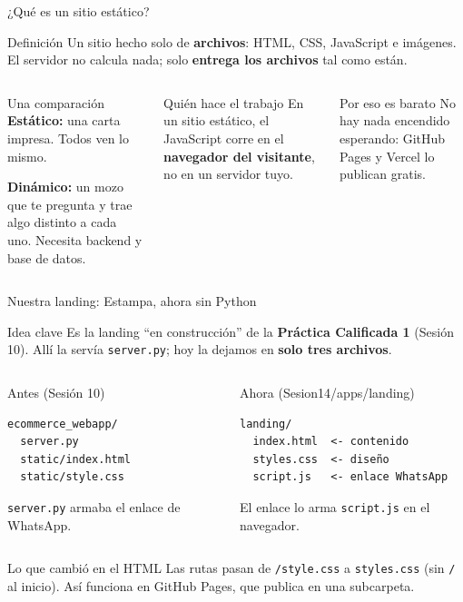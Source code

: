 \documentclass[aspectratio=169,10pt,c]{beamer}
\begin{document}
\begin{frame}{¿Qué es un sitio estático?}
\begin{block}{Definición}
\small Un sitio hecho solo de \textbf{archivos}: HTML, CSS, JavaScript e imágenes. El servidor no calcula nada; solo \textbf{entrega los archivos} tal como están.
\end{block}
\begin{columns}[T,onlytextwidth]
\begin{exampleblock}{Una comparación}
\small \textbf{Estático:} una carta impresa. Todos ven lo mismo.\par\smallskip
\textbf{Dinámico:} un mozo que te pregunta y trae algo distinto a cada uno. Necesita backend y base de datos.
\end{exampleblock}
\begin{block}{Quién hace el trabajo}
\small En un sitio estático, el JavaScript corre en el \textbf{navegador del visitante}, no en un servidor tuyo.
\end{block}
\begin{alertblock}{Por eso es barato}
\small No hay nada encendido esperando: GitHub Pages y Vercel lo publican gratis.
\end{alertblock}
\end{columns}
\end{frame}

\begin{frame}[fragile]{Nuestra landing: Estampa, ahora sin Python}
\begin{block}{Idea clave}
\small Es la landing ``en construcción'' de la \textbf{Práctica Calificada 1} (Sesión 10). Allí la servía \texttt{server.py}; hoy la dejamos en \textbf{solo tres archivos}.
\end{block}
\begin{columns}[T,onlytextwidth]
\begin{exampleblock}{Antes (Sesión 10)}
\begin{lstlisting}
ecommerce_webapp/
  server.py
  static/index.html
  static/style.css
\end{lstlisting}
\small \texttt{server.py} armaba el enlace de WhatsApp.
\end{exampleblock}
\begin{exampleblock}{Ahora (Sesion14/apps/landing)}
\begin{lstlisting}
landing/
  index.html  <- contenido
  styles.css  <- diseño
  script.js   <- enlace WhatsApp
\end{lstlisting}
\small El enlace lo arma \texttt{script.js} en el navegador.
\end{exampleblock}
\end{columns}
\par\vspace{1mm}
\begin{alertblock}{Lo que cambió en el HTML}
\small Las rutas pasan de \texttt{/style.css} a \texttt{styles.css} (sin \texttt{/} al inicio). Así funciona en GitHub Pages, que publica en una subcarpeta.
\end{alertblock}
\end{frame}
\end{document}
